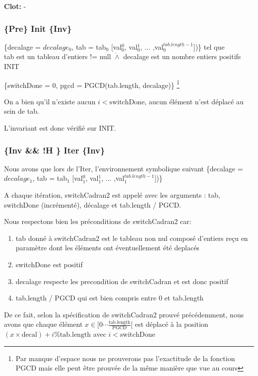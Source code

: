 \noindent \textbf{Clot: } - \\

\subsubsection*{\{Pre\} Init \{Inv\}}

\{decalage = $decalage_{0}$, tab = tab$_{0}$ [val$_{0}^{0}$, val$_{0}^{1}$, ... ,val$_{0}^{tab.length-1}$])\} tel que \\tab est un tableau d'entiers != null
$\dot{\wedge}$ decalage est un nombre entiers positifs\\

INIT

\{switchDone = 0, pgcd = PGCD(tab.length, decalage)\} \footnote{Par manque d'espace nous ne prouverons pas l'exactitude de la fonction PGCD mais elle peut être prouvée de la même manière que vue au cours}

On a bien qu'il n'existe aucun $i < \mathrm{switchDone}$, aucun élément n'est déplacé au sein de tab.

L'invariant est donc vérifié sur INIT.

\subsubsection*{\{Inv \&\& !H \} Iter \{Inv\}}

Nous avons que lors de l'Iter, l'environnement symbolique suivant \{decalage = $decalage_{1}$, tab = tab$_{1}$ [val$_{1}^{0}$, val$_{1}^{1}$, ... ,val$_{1}^{tab.length-1}$])\}

A chaque itération, switchCadran2 est appelé avec les arguments : tab,
switchDone (incrémenté), décalage et tab.length / PGCD.

Nous respectons bien les préconditions de switchCadran2 car:
\begin{enumerate}
 \item tab donné à switchCadran2 est le tableau non nul composé d'entiers reçu en paramètre dont les éléments ont éventuellement été deplacés
 \item switchDone est positif
 \item decalage respecte les precondition de switchCadran et est donc positif
 \item tab.length / PGCD qui est bien compris entre 0 et tab.length
\end{enumerate}


De ce fait,
selon la spécification de switchCadran2 prouvé précédemment, nous avons
que chaque élément $x \in [0\cdots
    \frac{\mathrm{tab.length}}{\mathrm{PGCD}}[$ est déplacé à la
        position $(x\times \mathrm{decal})+i \% \mathrm{tab.length}$ avec $i < \mathrm{switchDone}$

